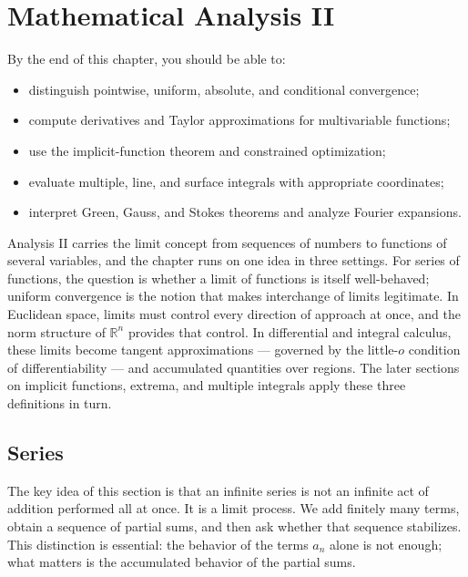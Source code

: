 \chapter{Mathematical Analysis II}

\begin{learningobjectives}
By the end of this chapter, you should be able to:
\begin{itemize}
    \item distinguish pointwise, uniform, absolute, and conditional convergence;
    \item compute derivatives and Taylor approximations for multivariable functions;
    \item use the implicit-function theorem and constrained optimization;
    \item evaluate multiple, line, and surface integrals with appropriate coordinates;
    \item interpret Green, Gauss, and Stokes theorems and analyze Fourier expansions.
\end{itemize}
\end{learningobjectives}

Analysis II carries the limit concept from sequences of numbers to functions of several variables, and the chapter runs on one idea in three settings. For series of functions, the question is whether a limit of functions is itself well-behaved; uniform convergence is the notion that makes interchange of limits legitimate. In Euclidean space, limits must control every direction of approach at once, and the norm structure of $\mathbb{R}^n$ provides that control. In differential and integral calculus, these limits become tangent approximations — governed by the little-$o$ condition of differentiability — and accumulated quantities over regions. The later sections on implicit functions, extrema, and multiple integrals apply these three definitions in turn.

\section{Series}


The key idea of this section is that an infinite series is not an infinite act of addition performed all at once. It is a limit process. We add finitely many terms, obtain a sequence of partial sums, and then ask whether that sequence stabilizes. This distinction is essential: the behavior of the terms $a_n$ alone is not enough; what matters is the accumulated behavior of the partial sums.

